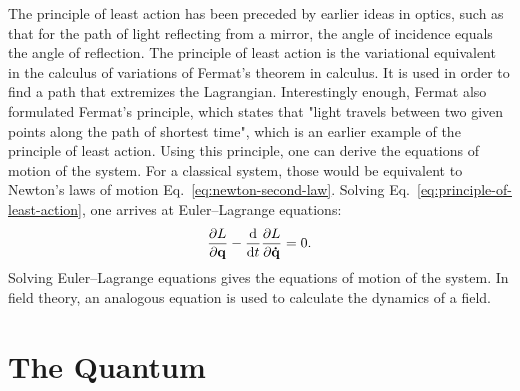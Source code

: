 The principle of least action has been preceded by earlier ideas in optics, such as that for the path of light reflecting from a mirror, the angle of incidence equals the angle of reflection. The principle of least action is the variational equivalent in the calculus of variations of Fermat's theorem in calculus. It is used in order to find a path that extremizes the Lagrangian. Interestingly enough, Fermat also formulated Fermat's principle, which states that "light travels between two given points along the path of shortest time", which is an earlier example of the principle of least action. Using this principle, one can derive the equations of motion of the system. For a classical system, those would be equivalent to  Newton's laws of motion Eq.~\ref{eq:newton-second-law}. Solving Eq.~\ref{eq:principle-of-least-action}, one arrives at Euler–Lagrange equations:
\begin{equation}
\pdv{L}{\vb{q}}-\dv{t}\pdv{L}{\vb{\dot{q}}}=0.
\end{equation}
Solving Euler–Lagrange equations gives the equations of motion of the system. In field theory, an analogous equation is used to calculate the dynamics of a field.

\section{The Quantum}
\label{sec:quantum}

